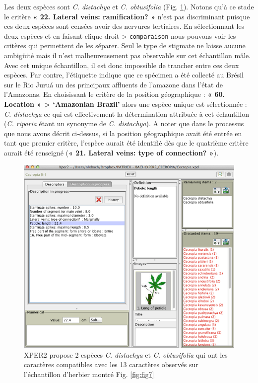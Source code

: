 \documentclass[a4paper]{article}
\theoremstyle{definition}
\theoremstyle{definition}
\theoremstyle{definition}
\theoremstyle{remark}
\begin{document}
Les deux espèces sont \emph{C. distachya} et \emph{C. obtusifolia} (Fig.
\ref{fig:fig8}). Notons qu'à ce stade le critère \textbf{« 22. Lateral
veins: ramification? »} n'est pas discriminant puisque ces deux espèces
sont censées avoir des nervures tertiaires. En sélectionnant les deux
espèces et en faisant clique-droit \textgreater{} \texttt{comparaison}
nous pouvons voir les critères qui permettent de les séparer. Seul le
type de stigmate ne laisse aucune ambigüité mais il n'est
malheureusement pas observable sur cet échantillon mâle. Avec cet unique
échantillon, il est donc impossible de trancher entre ces deux espèces.
Par contre, l'étiquette indique que ce spécimen a été collecté au Brésil
sur le Rio Juruá un des principaux affluents de l'amazone dans l'état de
l'Amazonas. En choisissant le critère de la position géographique :
\textbf{« 60. Location » \textgreater{} `Amazonian Brazil'} alors une
espèce unique est sélectionnée : \emph{C. distachya} ce qui est
effectivement la détermination attribuée à cet échantillon (\emph{C.
riparia} étant un synonyme de \emph{C. distachya}). A noter que dans le
processus que nous avons décrit ci-dessus, si la position géographique
avait été entrée en tant que premier critère, l'espèce aurait été
identifié dès que le quatrième critère aurait été renseigné (\textbf{«
21. Lateral veins: type of connection? »}).





\begin{figure}[H]

{\centering \includegraphics[width=1\linewidth]{figure/fig8} 

}

\caption{XPER2 propose 2 espèces \emph{C. distachya} et \emph{C.
obtusifolia} qui ont les caractères compatibles avec les 13 caractères
observés sur l'échantillon d'herbier montré Fig. \ref{fig:fig7}}\label{fig:fig8}
\end{figure}
\end{document}

